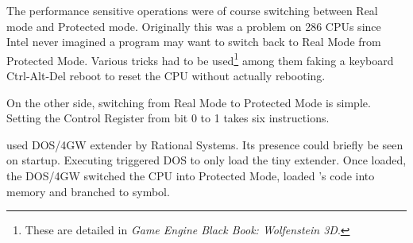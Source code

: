 The performance sensitive operations were of course switching between Real mode and Protected mode. Originally this was a problem on 286 CPUs since Intel never imagined a program may want to switch back to Real Mode from Protected Mode. Various tricks had to be used\footnote{These are detailed in \textit{Game Engine Black Book: Wolfenstein 3D}.} among them faking a keyboard Ctrl-Alt-Del reboot to reset the CPU without actually rebooting.\\
\par
On the other side, switching from Real Mode to Protected Mode is simple. Setting the Control Register from bit 0 to 1 takes six instructions.\\
\par
{}
\par

\doom{} used DOS/4GW extender by Rational Systems. Its presence could briefly be seen on startup. Executing  triggered DOS to only load the tiny extender. Once loaded, the DOS/4GW switched the CPU into Protected Mode, loaded \doom's code into memory and branched to  symbol.\\
\par
{}





